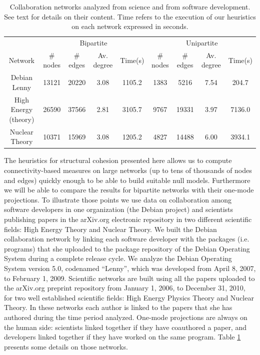 \begin{table}[h]
\begin{center}
\begin{small}
\begin{tabular}{|c|c|c|c|c|c|c|c|c|}
\hline
&\multicolumn{4}{|c|}{Bipartite}&\multicolumn{4}{|c|}{Unipartite}\\
Network&\# nodes&\# edges&Av. degree&Time(s)&\# nodes&\# edges&Av. degree&Time(s)\\
\hline
Debian Lenny&13121&20220&3.08&1105.2&1383&5216&7.54&204.7\\
High Energy (theory)&26590&37566&2.81&3105.7&9767&19331&3.97&7136.0\\
Nuclear Theory&10371&15969&3.08&1205.2&4827&14488&6.00&3934.1\\
\hline
\end{tabular}
\end{small}
\caption[Example collaboration networks description.]{Collaboration networks analyzed from science and from software development. See text for details on their content. Time refers to the execution of our heuristics on each network expressed in seconds.}
\label{desc}
\end{center}
\end{table}

The heuristics for structural cohesion presented here allows us to compute connectivity-based measures on large networks (up to tens of thousands of nodes and edges) quickly enough to be able to build suitable null models.  Furthermore we will be able to compare the results for bipartite networks with their one-mode projections. To illustrate those points we use data on collaboration among software developers in one organization (the Debian project) and scientists publishing papers in the arXiv.org electronic repository in two different scientific fields: High Energy Theory and Nuclear Theory. We built the Debian collaboration network by linking each software developer with the packages (i.e. programs) that she uploaded to the package repository of the Debian Operating System during a complete release cycle. We analyze the Debian Operating System version 5.0, codenamed ``Lenny'', which was developed from April 8, 2007, to February 1, 2009. Scientific networks are built using all the papers uploaded to the arXiv.org preprint repository from January 1, 2006, to December 31, 2010, for two well established scientific fields: High Energy Physics Theory and Nuclear Theory. In these networks each author is linked to the papers that she has authored during the time period analyzed. One-mode projections are always on the human side: scientists linked together if they have coauthored a paper, and developers linked together if they have worked on the same program. Table \ref{desc} presents some details on those networks.

